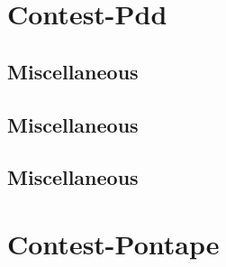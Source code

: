 \section{Contest-Pdd}
\subsection{Miscellaneous}
\raggedbottom
\vspace{-.7\baselineskip}\hrulefill
\vspace{0.1\baselineskip}\subsection{Miscellaneous}
\raggedbottom
\vspace{-.7\baselineskip}\hrulefill
\vspace{0.1\baselineskip}\subsection{Miscellaneous}
\raggedbottom
\vspace{-.7\baselineskip}\hrulefill
\vspace{0.1\baselineskip}
\section{Contest-Pontape}
